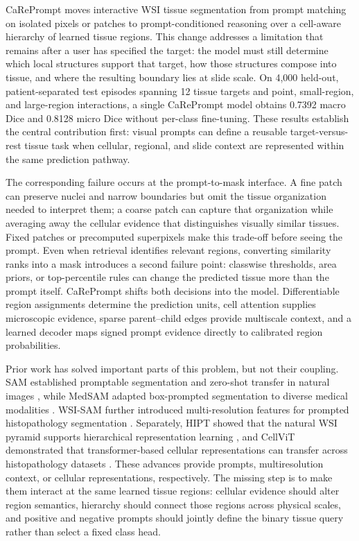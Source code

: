\documentclass[letterpaper]{article} %
\begin{document}
CaRePrompt moves interactive WSI tissue segmentation from prompt matching on isolated pixels or patches to prompt-conditioned reasoning over a cell-aware hierarchy of learned tissue regions. This change addresses a limitation that remains after a user has specified the target: the model must still determine which local structures support that target, how those structures compose into tissue, and where the resulting boundary lies at slide scale. On 4,000 held-out, patient-separated test episodes spanning 12 tissue targets and point, small-region, and large-region interactions, a single CaRePrompt model obtains 0.7392 macro Dice and 0.8128 micro Dice without per-class fine-tuning. These results establish the central contribution first: visual prompts can define a reusable target-versus-rest tissue task when cellular, regional, and slide context are represented within the same prediction pathway.

The corresponding failure occurs at the prompt-to-mask interface. A fine patch can preserve nuclei and narrow boundaries but omit the tissue organization needed to interpret them; a coarse patch can capture that organization while averaging away the cellular evidence that distinguishes visually similar tissues. Fixed patches or precomputed superpixels make this trade-off before seeing the prompt. Even when retrieval identifies relevant regions, converting similarity ranks into a mask introduces a second failure point: classwise thresholds, area priors, or top-percentile rules can change the predicted tissue more than the prompt itself. CaRePrompt shifts both decisions into the model. Differentiable region assignments determine the prediction units, cell attention supplies microscopic evidence, sparse parent--child edges provide multiscale context, and a learned decoder maps signed prompt evidence directly to calibrated region probabilities.

Prior work has solved important parts of this problem, but not their coupling. SAM established promptable segmentation and zero-shot transfer in natural images \cite{kirillov2023segment}, while MedSAM adapted box-prompted segmentation to diverse medical modalities \cite{ma2024medsam}. WSI-SAM further introduced multi-resolution features for prompted histopathology segmentation \cite{liu2024wsisam}. Separately, HIPT showed that the natural WSI pyramid supports hierarchical representation learning \cite{chen2022hipt}, and CellViT demonstrated that transformer-based cellular representations can transfer across histopathology datasets \cite{horst2024cellvit}. These advances provide prompts, multiresolution context, or cellular representations, respectively. The missing step is to make them interact at the same learned tissue regions: cellular evidence should alter region semantics, hierarchy should connect those regions across physical scales, and positive and negative prompts should jointly define the binary tissue query rather than select a fixed class head.
\end{document}
